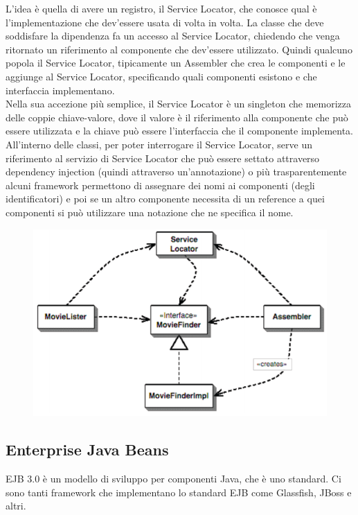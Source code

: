 \begin{itemize}
    L’idea è quella di avere un registro, il Service Locator, che conosce qual è l’implementazione che dev’essere usata di volta in volta. La classe che deve soddisfare la dipendenza fa un accesso al Service Locator, chiedendo che venga ritornato un riferimento al componente che dev’essere utilizzato. Quindi qualcuno popola il Service Locator, tipicamente un Assembler che crea le componenti e le aggiunge al Service Locator, specificando quali componenti esistono e che interfaccia implementano.\\
    
    Nella sua accezione più semplice, il Service Locator è un singleton che memorizza delle coppie chiave-valore, dove il valore è il riferimento alla componente che può essere utilizzata e la chiave può essere l’interfaccia che il componente implementa.\\
    
    All’interno delle classi, per poter interrogare il Service Locator, serve un riferimento al servizio di Service Locator che può essere settato attraverso dependency injection (quindi attraverso un’annotazione) o più trasparentemente alcuni framework permettono di assegnare dei nomi ai componenti (degli identificatori) e poi se un altro componente necessita di un reference a quei componenti si può utilizzare una notazione che ne specifica il nome.
    \begin{figure}[H]
        \centering
        \includegraphics[scale=0.4]{Imm/service_locator.png}
    \end{figure}
\end{itemize}

\subsection{Enterprise Java Beans}
EJB 3.0 è un modello di sviluppo per componenti Java, che è uno standard. Ci sono tanti framework che implementano lo standard EJB come Glassfish, JBoss e altri.\\

